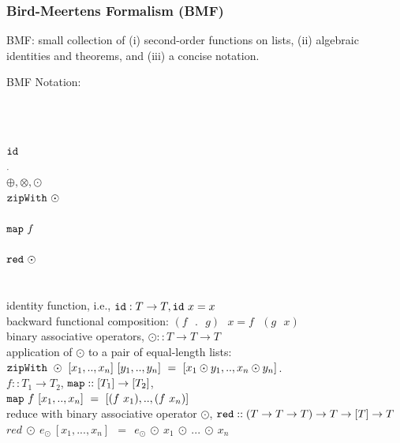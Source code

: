 \documentclass{beamer}
\begin{document}
\begin{frame}
  \frametitle{Bird-Meertens Formalism (BMF)} 

BMF: small collection of (i) second-order functions on lists,
    (ii) algebraic identities and theorems, 
    and (iii) a concise notation. 

\begin{block}{BMF Notation:}
\begin{columns} 
\vspace{-4ex}
$\mbox{ }$ \\
$\mbox{ }$ \\
${\tt id}$ \\ 
${\tt .}$\\
$ \oplus, \otimes, \odot$ \\
$ {\tt zipWith} \mbox{ } \odot$\\
$\mbox{ }$\\
$ {\tt map} \mbox{ } f$\\
$\mbox{ }$\\
$ {\tt red} \mbox{ } \odot$\\ %
$\mbox{ }$\\
$\mbox{ }$\\
identity function, i.e., ${\tt id} : T \rightarrow T, {\tt id}\mbox{ }x = x$ \\
backward functional composition: $(f\mbox{ }.\mbox{ }g)\mbox{ }x = f\mbox{ }(g\mbox{ }x)$ \\
binary associative operators, $\odot :: T \rightarrow T \rightarrow T$ \\
application of $\odot$ to a pair of equal-length lists: \\
${\tt zipWith}\mbox{ }\odot\mbox{ }[x_1,..,x_n]\mbox{ }[y_1,..,y_n]\mbox{ }=\mbox{ }[x_1\odot y_1,..,x_n\odot y_n]$. \\
$f :: T_{1} \rightarrow T_{2}$, ${\tt map} :: [T_{1}] \rightarrow [T_{2}]$, \\
${\tt map} \mbox{ }f\mbox{ } [x_{1},..,x_{n}] \mbox{ }=\mbox{ }[(f\mbox{ }x_{1}),..,(f\mbox{ }x_{n})]$ \\
reduce with binary associative operator $\odot$, ${\tt red}::(T \rightarrow T \rightarrow T) \rightarrow T \rightarrow [T] \rightarrow T$\\
$red~\odot~e_\odot~[x_1,...,x_n]~~=~~e_\odot~\odot~x_1~\odot~...~\odot~x_n$\\ 
\end{columns}
\end{block}
\end{frame}
\end{document}
